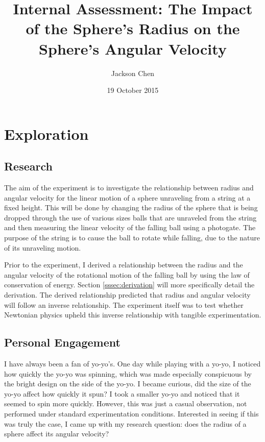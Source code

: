 \documentclass[10pt, letterpaper]{article}
\newcommand{\subtitle}[1]{
  \posttitle{
    \par\end{center}
    \begin{center}\large#1\end{center}
    \vskip0.5em}
}
\begin{document}
  \title{Internal Assessment: The Impact of the Sphere's Radius on the Sphere's Angular Velocity}
  \subtitle {IB Physics II Period 6, Dr. Petach}
  \date{19 October 2015}
  \author{Jackson Chen}
  \maketitle

  \section{Exploration}

    \subsection{Research}

    The aim of the experiment is to investigate the relationship between radius and
    angular velocity for the linear motion of a sphere unraveling from a string at a
    fixed height. This will be done by changing the radius of the sphere that is being
    dropped through the use of various sizes balls that are unraveled from the string
    and then measuring the linear velocity of the falling ball using a photogate.
    The purpose of the string is to cause the ball to rotate while falling, due to the
    nature of its unraveling motion.

    Prior to the experiment, I derived a relationship between the radius and the angular
    velocity of the rotational motion of the falling ball by using the law of conservation of
    energy. Section \ref{sssec:derivation} will more specifically detail the derivation.
    The derived relationship predicted that radius and angular velocity will follow an inverse relationship.
    The experiment itself was to test whether Newtonian physics upheld this inverse
    relationship with tangible experimentation.

    \subsection{Personal Engagement}

    I have always been a fan of yo-yo's. One day while playing with a yo-yo, I noticed how
    quickly the yo-yo was spinning, which was made especially conspicuous by the bright design
    on the side of the yo-yo. I became curious, did the size of the yo-yo affect how quickly
    it spun? I took a smaller yo-yo and noticed that it seemed to spin more quickly.
    However, this was just a casual observation, not performed under standard experimentation
    conditions. Interested in seeing if this was truly the case, I came up with my research
    question: does the radius of a sphere affect its angular velocity?
\end{document}
